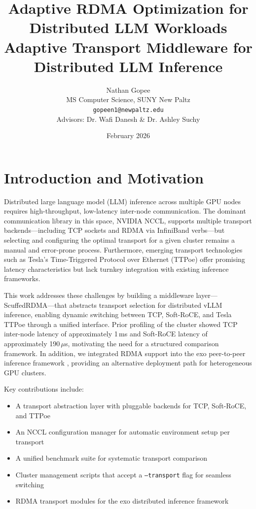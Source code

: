 \documentclass[10pt,letterpaper]{article}
\title{\textbf{Adaptive RDMA Optimization for Distributed LLM Workloads}\\[0.5em]
\large Adaptive Transport Middleware for Distributed LLM Inference}
\author{Nathan Gopee\\
MS Computer Science, SUNY New Paltz\\
\texttt{gopeen1@newpaltz.edu}\\[1em]
\small Advisors: Dr. Wafi Danesh \& Dr. Ashley Suchy}
\date{February 2026}
\begin{document}
\maketitle

\section{Introduction and Motivation}

Distributed large language model (LLM) inference across multiple GPU nodes requires high-throughput, low-latency inter-node communication. The dominant communication library in this space, NVIDIA NCCL, supports multiple transport backends---including TCP sockets and RDMA via InfiniBand verbs---but selecting and configuring the optimal transport for a given cluster remains a manual and error-prone process. Furthermore, emerging transport technologies such as Tesla's Time-Triggered Protocol over Ethernet (TTPoe) \cite{ttpoe-repo} offer promising latency characteristics but lack turnkey integration with existing inference frameworks.

This work addresses these challenges by building a middleware layer---ScuffedRDMA---that abstracts transport selection for distributed vLLM inference, enabling dynamic switching between TCP, Soft-RoCE, and Tesla TTPoe through a unified interface. Prior profiling of the cluster showed TCP inter-node latency of approximately 1\,ms and Soft-RoCE latency of approximately 190\,$\mu$s, motivating the need for a structured comparison framework. In addition, we integrated RDMA support into the exo peer-to-peer inference framework \cite{exo-github}, providing an alternative deployment path for heterogeneous GPU clusters.

Key contributions include:

\begin{itemize}[noitemsep]
    \item A transport abstraction layer with pluggable backends for TCP, Soft-RoCE, and TTPoe
    \item An NCCL configuration manager for automatic environment setup per transport
    \item A unified benchmark suite for systematic transport comparison
    \item Cluster management scripts that accept a \texttt{--transport} flag for seamless switching
    \item RDMA transport modules for the exo distributed inference framework
\end{itemize}
\end{document}
